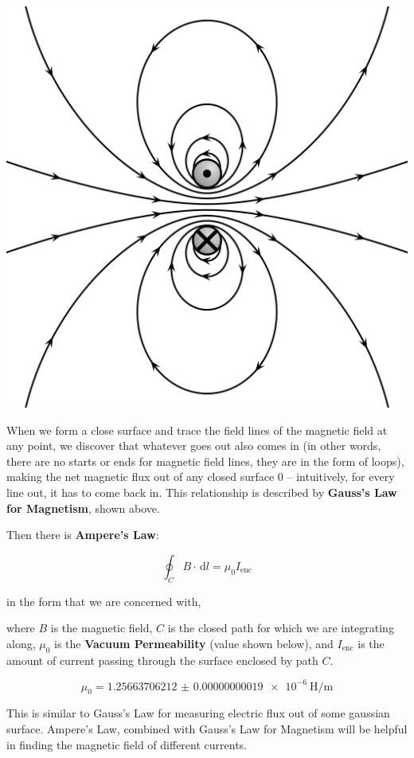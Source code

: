 \hfil \includegraphics[scale=0.05]{assets/mag-i-loop.png}

When we form a close surface and trace the field lines of the magnetic field at any point, we discover that whatever goes out also comes in (in other words, there are no starts or ends for magnetic field lines, they are in the form of loops), making the net magnetic flux out of any closed surface 0 -- intuitively, for every line out, it has to come back in. This relationship is described by \textbf{Gauss's Law for Magnetism}, shown above.

Then there is \textbf{Ampere's Law}:

\[\oint_C B \cdot \,\mathrm{d}l = \mu_0 I_{\mathrm{enc}}\]

\hfil in the form that we are concerned with,

where $B$ is the magnetic field, $C$ is the closed path for which we are integrating along, $\mu_0$ is the \textbf{Vacuum Permeability} (value shown below), and $I_{\mathrm{enc}}$ is the amount of current passing through the surface enclosed by path $C$.

\[\mu_0 = \SI{1.25663706212(19)e-6}{\henry\per\meter}\]

This is similar to Gauss's Law for measuring electric flux out of some gaussian surface. Ampere's Law, combined with Gauss's Law for Magnetism will be helpful in finding the magnetic field of different currents.

